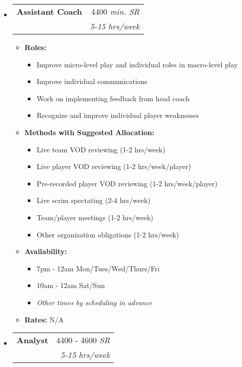 \documentclass[letterpaper,11pt]{article}
\makeatletter
\newcommand{\resitem}[1]{\item #1 \vspace{-2pt}}
\newcommand{\ressubheading}[4]{
\begin{tabular*}{6.5in}{l@{\cftdotfill{\cftsecdotsep}\extracolsep{\fill}}r}
		\textbf{#1} & #2 \\
		\textit{#3} & \textit{#4} \\
\end{tabular*}\vspace{-6pt}}
\makeatother
\begin{document}
\begin{itemize}
\item[]

  \ressubheading{Assistant Coach}{4400 \textit{min. SR}}{}{\textit{5-15 hrs/week}}

  \begin{itemize}
    \resitem{\textbf{Roles:}
    \begin{itemize}
    \item Improve micro-level play and individual roles in macro-level play
    \item Improve individual communications
    \item Work on implementing feedback from head coach
    \item Recognize and improve individual player weaknesses
    \end{itemize}}
    \resitem{\textbf{Methods with Suggested Allocation:}
    \begin{itemize}
    \item Live team VOD reviewing (1-2 hrs/week)
    \item Live player VOD reviewing (1-2 hrs/week/player)
    \item Pre-recorded player VOD reviewing (1-2 hrs/week/player)
    \item Live scrim spectating (2-4 hrs/week)
    \item Team/player meetings (1-2 hrs/week)
    \item Other organization obligations (1-2 hrs/week)
    \end{itemize}}
    \resitem{\textbf{Availability:}
    \begin{itemize}
    \item 7pm - 12am Mon/Tues/Wed/Thurs/Fri
    \item 10am - 12am Sat/Sun
    \item \textit{Other times by scheduling in advance}
    \end{itemize}}
    \resitem{\textbf{Rates:} N/A}
  \end{itemize}

\item[]

  \ressubheading{Analyst}{4400 - 4600 \textit{SR}}{}{\textit{5-15 hrs/week}}


\end{itemize}
\end{document}
